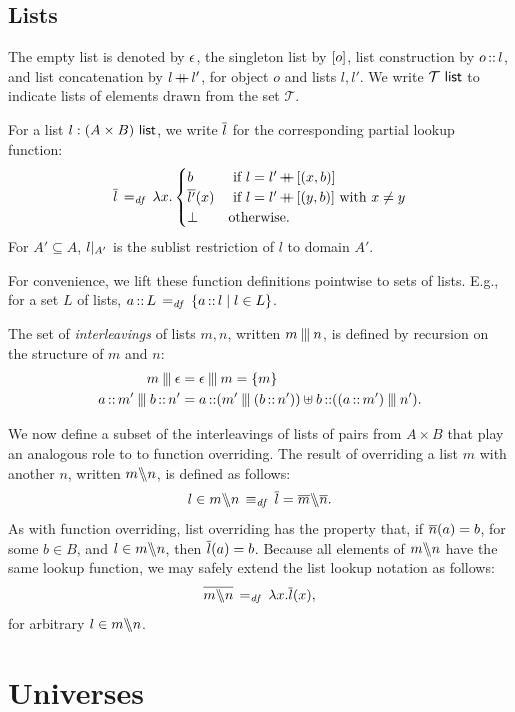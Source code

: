 \documentclass[11pt]{report}
\begin{document}
\subsection{Lists}
\label{sec:lists}

The empty list is denoted by $\lnil$, the singleton list by $\lsingle{o}$, list construction by $o \lcons l$, and list concatenation by $l \lapp l'$, for object $o$ and lists $l,l'$. We write $\listof{\mathcal{T}}$ to indicate lists of elements drawn from the set $\mathcal{T}$. 

For a list $l : \listof{(A \times B)}$, we write $\funof{l}$ for the corresponding partial lookup function: \[ \funof{l} \eqdef \lambda x .\begin{cases}
	b &\text{ if $l = l' \lapp \lsingle{(x,b)}$}\\
	\funof{l'}(x) &\text{ if $l = l' \lapp \lsingle{(y,b)}$ with $x \neq y$}\\
	\bot & \text{otherwise.}
\end{cases}\] For $A' \subseteq A$, $\restrict{l}{A'}$ is the sublist restriction of $l$ to domain $A'$.

For convenience, we lift these function definitions pointwise to sets of lists. E.g., for a set $L$ of lists, $a \lcons L \eqdef \setof{a \lcons l}{l \in L}$. 

The set of \emph{interleavings} of lists $m,n$, written $m \merge n$, is defined by recursion on the structure of $m$ and $n$: \begin{align*}
	m \merge \lnil & = \lnil \merge m = \set{m} \\ 
	a \lcons m' \merge b \lcons n' & = a \lcons (m' \merge (b\lcons n')) \uplus b \lcons ((a \lcons m') \merge n').
\end{align*}

We now define a subset of the interleavings of lists of pairs from $A \times B$ that play an analogous role to to function overriding. The result of overriding a list $m$ with another $n$, written $m \override n$, is defined as follows: \[ l \in m \override n \iffdef \funof{l} = \funof{m} \override \funof{n}.\] As with function overriding, list overriding has the property that, if $\funof{n}(a) = b$, for some $b \in B$, and $l \in m \override n$, then $\funof{l}(a) = b$. Because all elements of $m \override n$ have the same lookup function, we may safely extend the list lookup notation as follows: \[ \funof{m \override n} \eqdef \lambda x . \funof{l}(x),\] for arbitrary $l \in m \override n$. 

\section{Universes}
\end{document}
